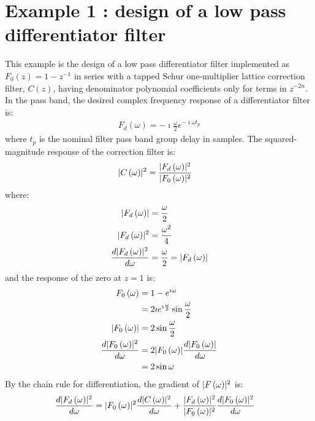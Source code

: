 \documentclass[a4paper,twoside,10pt,english]{article}
\DeclarePairedDelimiter{\mathabs}{\lvert}{\rvert}
\begin{document}
\section{Example 1 : design of a low pass differentiator filter}
This example is the design of a low pass differentiator filter
implemented as $F_{0}\left(z\right)=1-z^{-1}$ in series with a tapped Schur
one-multiplier lattice correction filter, $C\left(z\right)$, having denominator
polynomial coefficients only for terms in $z^{-2n}$. In the pass band, the
desired complex frequency response of a differentiator filter is:
\begin{align*}
  F_{d}\left(\omega\right)=-\imath\frac{\omega}{2}e ^{-\imath\omega t_{p}}
\end{align*}
where $t_{p}$ is the nominal filter pass band group delay in samples.
The squared-magnitude response of the correction filter is:
\begin{align*}
  \mathabs{C\left(\omega\right)}^{2}
  &= \frac{\mathabs{F_{d}\left(\omega\right)}^{2}}
    {\mathabs{F_{0}\left(\omega\right)}^{2}}
\end{align*}
where:
\begin{align*}
  \mathabs{F_{d}\left(\omega\right)} &= \frac{\omega}{2} \\
  \mathabs{F_{d}\left(\omega\right)}^{2}&= \frac{\omega^{2}}{4} \\  
  \frac{d\mathabs{F_{d}\left(\omega\right)}^{2}}{d\omega}
     &= \frac{\omega}{2} = \mathabs{F_{d}\left(\omega\right)}
\end{align*}
and the response of the zero at $z=1$ is:
\begin{align*}
  F_{0}\left(\omega\right) &= 1-e^{\imath\omega} \\
        &=2\imath{} e^{\imath\frac{\omega}{2}}\sin\frac{\omega}{2} \\
  \mathabs{F_{0}\left(\omega\right)} &= 2\sin\frac{\omega}{2} \\
  \frac{d\mathabs{F_{0}\left(\omega\right)}^{2}}{d\omega}
        &=2\mathabs{F_{0}\left(\omega\right)}
          \frac{d\mathabs{F_{0}\left(\omega\right)}}{d\omega} \\
        &= 2\sin\omega
\end{align*}
By the chain rule for differentiation, the gradient of
$\mathabs{F\left(\omega\right)}^{2}$ is:
\begin{align*}
  \frac{d\mathabs{F_{d}\left(\omega\right)}^{2}}{d\omega}
  &= \mathabs{F_{0}\left(\omega\right)}^{2}
     \frac{d\mathabs{C\left(\omega\right)}^{2}}{d\omega} +
    \frac{\mathabs{F_{d}\left(\omega\right)}^{2}}
    {\mathabs{F_{0}\left(\omega\right)}^{2}}
    \frac{d\mathabs{F_{0}\left(\omega\right)}^{2}}{d\omega}
\end{align*}
\end{document}
